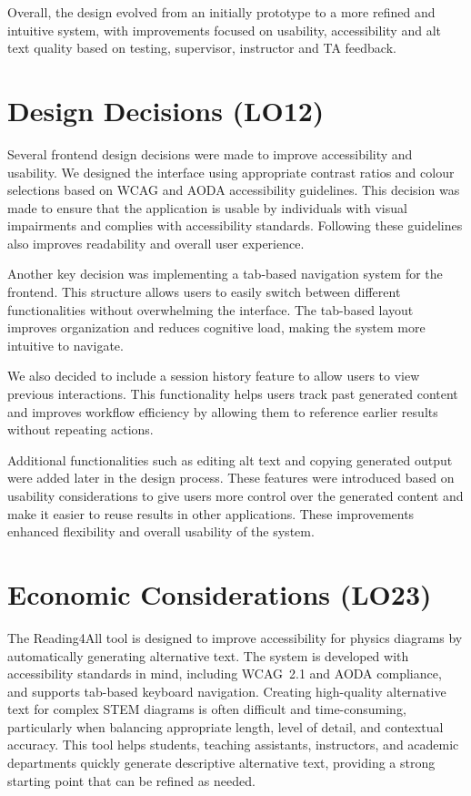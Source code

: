 \documentclass{article}
\begin{document}
Overall, the design evolved from an initially prototype to a more refined and intuitive system, with improvements 
focused on usability, accessibility and alt text quality based on testing, supervisor, instructor and TA feedback. 

\section{Design Decisions (LO12)}

Several frontend design decisions were made to improve accessibility and usability. 
We designed the interface using appropriate contrast ratios and colour selections 
based on WCAG and AODA accessibility guidelines. This decision was made to ensure 
that the application is usable by individuals with visual impairments and complies 
with accessibility standards. Following these guidelines also improves readability 
and overall user experience.

Another key decision was implementing a tab-based navigation system for the frontend. 
This structure allows users to easily switch between different functionalities without 
overwhelming the interface. The tab-based layout improves organization and reduces 
cognitive load, making the system more intuitive to navigate.

We also decided to include a session history feature to allow users to view previous 
interactions. This functionality helps users track past generated content and improves 
workflow efficiency by allowing them to reference earlier results without repeating 
actions.

Additional functionalities such as editing alt text and copying generated output were 
added later in the design process. These features were introduced based on usability 
considerations to give users more control over the generated content and make it easier 
to reuse results in other applications. These improvements enhanced flexibility and 
overall usability of the system.

\section{Economic Considerations (LO23)}

The Reading4All tool is designed to improve accessibility for physics diagrams by automatically generating alternative text. 
The system is developed with accessibility standards in mind, including WCAG~2.1 and AODA compliance, and supports 
tab-based keyboard navigation. Creating high-quality alternative text for complex STEM diagrams is often difficult and 
time-consuming, particularly when balancing appropriate length, level of detail, and contextual accuracy. This tool helps 
students, teaching assistants, instructors, and academic departments quickly generate descriptive alternative text, providing 
a strong starting point that can be refined as needed.
\end{document}
